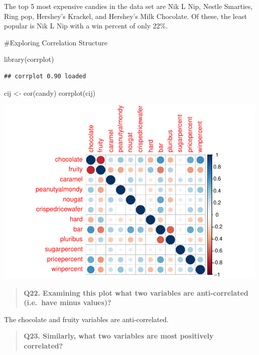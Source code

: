 \documentclass[
]{article}
\newenvironment{Shaded}{\begin{snugshade}}{\end{snugshade}}
\newcommand{\FunctionTok}[1]{\textcolor[rgb]{0.00,0.00,0.00}{#1}}
\newcommand{\NormalTok}[1]{#1}
\newcommand{\OtherTok}[1]{\textcolor[rgb]{0.56,0.35,0.01}{#1}}
\begin{document}
The top 5 most expensive candies in the data set are Nik L Nip, Nestle
Smarties, Ring pop, Hershey's Krackel, and Hershey's Milk Chocolate. Of
these, the least popular is Nik L Nip with a win percent of only 22\%.

\#Exploring Correlation Structure

\begin{Shaded}
\begin{Highlighting}[]
\FunctionTok{library}\NormalTok{(corrplot)}
\end{Highlighting}
\end{Shaded}

\begin{verbatim}
## corrplot 0.90 loaded
\end{verbatim}

\begin{Shaded}
\begin{Highlighting}[]
\NormalTok{cij }\OtherTok{\textless{}{-}} \FunctionTok{cor}\NormalTok{(candy)}
\FunctionTok{corrplot}\NormalTok{(cij)}
\end{Highlighting}
\end{Shaded}

\includegraphics{Class-10-Halloween-Candy_files/figure-latex/unnamed-chunk-20-1.pdf}

\begin{quote}
\textbf{Q22. Examining this plot what two variables are anti-correlated
(i.e.~have minus values)?}
\end{quote}

The chocolate and fruity variables are anti-correlated.

\begin{quote}
\textbf{Q23. Similarly, what two variables are most positively
correlated?}
\end{quote}
\end{document}
